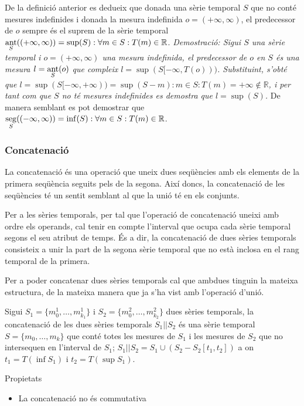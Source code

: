 De la definició anterior es dedueix que donada una sèrie temporal $S$
que no conté mesures indefinides i donada la mesura indefinida
$o=(+\infty,\infty)$, el predecessor de $o$ sempre és el suprem de la
sèrie temporal $\operatorname*{ant}\limits_S( (+\infty,\infty) ) = \sup(S): \forall
m\in S: T(m)\in\mathbb{R}$.  %
\emph{Demostració: Sigui $S$ una sèrie temporal i $o=(+\infty,\infty)$
  una mesura indefinida, el predecessor de $o$ en $S$ és una mesura
  $l=\operatorname*{ant}\limits_S(o)$ que compleix
  $l=\sup(S[-\infty,T(o)))$. Substituint, s'obté que
  $l=\sup(S[-\infty,+\infty))=\sup(S-m):m\in S:T(m)=+\infty \notin
  \mathbb{R}$, i per tant com que $S$ no té mesures indefinides es
  demostra que $l=\sup(S)$.  } De manera semblant es pot demostrar que
$\operatorname*{seg}\limits_S( (-\infty,\infty) ) = \inf(S): \forall m\in S:
T(m)\in\mathbb{R}$.


\subsubsection{Concatenació}

La concatenació és una operació que uneix dues seqüències amb els
elements de la primera seqüència seguits pels de la segona. Així
doncs, la concatenació de les seqüències té un sentit semblant al que
la unió té en els conjunts. 

Per a les sèries temporals, per tal que l'operació de concatenació
uneixi amb ordre els operands, cal tenir en compte l'interval que
ocupa cada sèrie temporal segons el seu atribut de temps.  És a dir,
la concatenació de dues sèries temporals consisteix a unir la part de
la segona sèrie temporal que no està inclosa en el rang temporal de la
primera.

Per a poder concatenar dues sèries temporals cal que ambdues tinguin
la mateixa estructura, de la mateixa manera que ja s'ha vist amb
l'operació d'unió.


\begin{definition}[concatenació]
  Sigui $S_1=\{m_0^1, \dotsc, m_{k_1}^1\}$ i $S_2=\{m_0^2, \dotsc,
  m_{k_2}^2\}$ dues sèries temporals, la concatenació de les dues
  sèries temporals $S_1 || S_2$ és una sèrie temporal $S=\{m_0,
  \dotsc, m_k\}$ que conté totes les mesures de $S_1$ i les mesures de
  $S_2$ que no intersequen en l'interval de $S_1$; $S_1 || S_2 = S_1
  \cup ( S_2 - S_2[t_1,t_2] )$ a on $t_1=T(\inf S_1)$ i $t_2=T(\sup
  S_1)$.
\end{definition}


Propietats
\begin{itemize}
\item La concatenació no és commutativa
\end{itemize}







